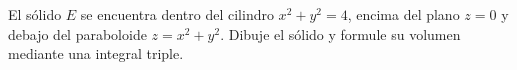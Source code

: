 El sólido $E$ se encuentra dentro del cilindro $x^2+y^2=4$, encima del plano $z=0$ y debajo del paraboloide $z=x^2+y^2$. Dibuje el sólido y formule su volumen mediante una integral triple.
